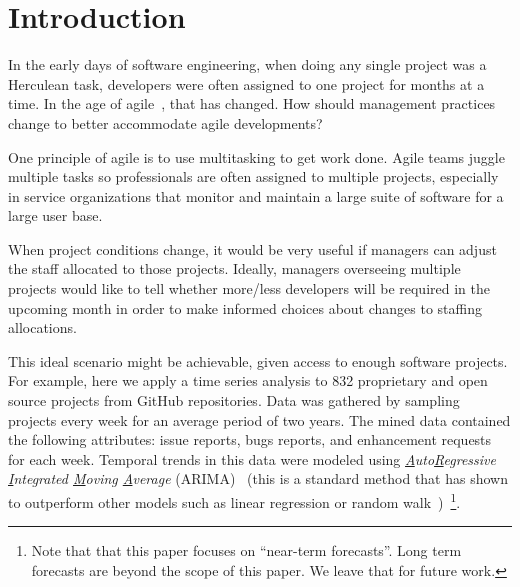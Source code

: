 \documentclass[sigconf, preprint]{acmart}
\begin{document}
\maketitle


\section{Introduction}
\label{sect:intro}

In the early days of software engineering, when doing any single project
was a Herculean task, developers were often assigned to one project for months 
at  a time.
In the age of agile~\cite{abrahamsson2017agile, 
dybaa2008empirical, misra2009identifying, begel2007usage}, that has changed. How should management practices change to better accommodate agile developments?

One principle of agile  is to use multitasking to get work done.
Agile teams juggle multiple tasks so professionals are often assigned to 
multiple projects, especially in service organizations that monitor and 
maintain a large suite of software for a large user base. 

When project conditions change, it would be very useful if managers can  
adjust the staff allocated to those projects. Ideally, managers   overseeing 
multiple projects would like to tell whether more/less developers will be 
required in the upcoming month in order to make informed choices about changes 
to staffing allocations.

This  ideal scenario might be achievable, given access to enough software 
projects. For example, here we apply a  time series analysis to   832 
proprietary and open source projects from GitHub repositories.  Data was 
gathered by sampling projects every week for an average period of two years. 
The mined data contained the following attributes: issue reports, bugs reports, 
and enhancement requests for each week. Temporal trends in this data were
modeled using \textit{\underline{A}uto\underline{R}egressive 
\underline{I}ntegrated \underline{M}oving \underline{A}verage} 
(ARIMA)~\cite{box2015time} (this is a standard method that has shown to  
outperform other models such as linear regression or random 
walk~\cite{kenmei2008trend, ho1998use, pai2006software, amin2013approach, 
burtschy1997improving})~\footnote{Note that that this paper focuses on 
``near-term  
forecasts''. Long term forecasts are beyond the scope of this paper. We leave 
that for future work.}.
\end{document}
